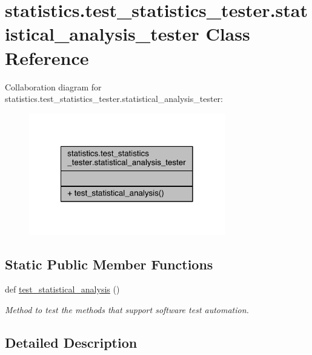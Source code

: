 \hypertarget{classstatistics_1_1test__statistics__tester_1_1statistical__analysis__tester}{}\section{statistics.\+test\+\_\+statistics\+\_\+tester.\+statistical\+\_\+analysis\+\_\+tester Class Reference}
\label{classstatistics_1_1test__statistics__tester_1_1statistical__analysis__tester}


Collaboration diagram for statistics.\+test\+\_\+statistics\+\_\+tester.\+statistical\+\_\+analysis\+\_\+tester\+:\nopagebreak
\begin{figure}[H]
\begin{center}
\leavevmode
\includegraphics[width=242pt]{d2/d41/classstatistics_1_1test__statistics__tester_1_1statistical__analysis__tester__coll__graph}
\end{center}
\end{figure}
\subsection*{Static Public Member Functions}
\begin{DoxyCompactItemize}
\item 
def \hyperlink{classstatistics_1_1test__statistics__tester_1_1statistical__analysis__tester_ad05a0d6e83aaba083bfba6212ec0b971}{test\+\_\+statistical\+\_\+analysis} ()
\begin{DoxyCompactList}\small\item\em Method to test the methods that support software test automation. \end{DoxyCompactList}\end{DoxyCompactItemize}


\subsection{Detailed Description}


